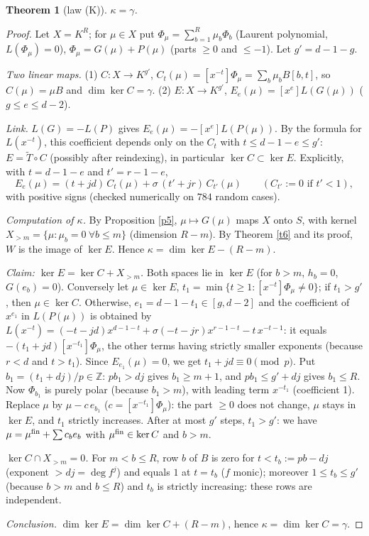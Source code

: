 \documentclass[11pt,a4paper]{article}
\newtheorem{thm}{Theorem}
\theoremstyle{remark}\newtheorem*{rem}{Remark}
\begin{document}
\begin{thm}[law (K)]\label{t9} $\kappa=\gamma$.\end{thm}
\begin{proof} Let $X=K^R$; for $\mu\in X$ put $\Phi_\mu=\sum_{b=1}^R\mu_b\Phi_b$ (Laurent polynomial, $L(\Phi_\mu)=0$), $\Phi_\mu=G(\mu)+P(\mu)$ (parts $\ge0$ and $\le-1$). Let $g'=d-1-g$.

\emph{Two linear maps.} (1) $C:X\to K^{g'}$, $C_t(\mu)=[x^{-t}]\Phi_\mu=\sum_b\mu_bB[b,t]$, so $C(\mu)=\mu B$ and $\dim\ker C=\gamma$. (2) $E:X\to K^{g'}$, $E_e(\mu)=[x^e]L(G(\mu))$ ($g\le e\le d-2$).

\emph{Link.} $L(G)=-L(P)$ gives $E_e(\mu)=-[x^e]L(P(\mu))$. By the formula for $L(x^{-t})$, this coefficient depends only on the $C_t$ with $t\le d-1-e\le g'$: $E=\widetilde T\circ C$ (possibly after reindexing), in particular $\ker C\subset\ker E$. Explicitly, with $t=d-1-e$ and $t'=r-1-e$,
$$E_e(\mu)=(t+jd)\,C_t(\mu)+\sigma\,(t'+jr)\,C_{t'}(\mu)\qquad(C_{t'}:=0\text{ if }t'<1),$$
with positive signs (checked numerically on $784$ random cases).

\emph{Computation of $\kappa$.} By Proposition \ref{p5}, $\mu\mapsto G(\mu)$ maps $X$ onto $S$, with kernel $X_{>m}=\{\mu:\mu_b=0\ \forall b\le m\}$ (dimension $R-m$). By Theorem \ref{t6} and its proof, $W$ is the image of $\ker E$. Hence $\kappa=\dim\ker E-(R-m)$.

\emph{Claim: $\ker E=\ker C+X_{>m}$.} Both spaces lie in $\ker E$ (for $b>m$, $h_b=0$, $G(e_b)=0$). Conversely let $\mu\in\ker E$, $t_1=\min\{t\ge1:[x^{-t}]\Phi_\mu\ne0\}$; if $t_1>g'$, then $\mu\in\ker C$. Otherwise, $e_1=d-1-t_1\in[g,d-2]$ and the coefficient of $x^{e_1}$ in $L(P(\mu))$ is obtained by $L(x^{-t})=(-t-jd)x^{d-1-t}+\sigma(-t-jr)x^{r-1-t}-t\,x^{-t-1}$: it equals $-(t_1+jd)[x^{-t_1}]\Phi_\mu$, the other terms having strictly smaller exponents (because $r<d$ and $t>t_1$). Since $E_{e_1}(\mu)=0$, we get $t_1+jd\equiv0\pmod p$. Put $b_1=(t_1+dj)/p\in\mathbb Z$: $pb_1>dj$ gives $b_1\ge m+1$, and $pb_1\le g'+dj$ gives $b_1\le R$. Now $\Phi_{b_1}$ is purely polar (because $b_1>m$), with leading term $x^{-t_1}$ (coefficient 1). Replace $\mu$ by $\mu-c\,e_{b_1}$ ($c=[x^{-t_1}]\Phi_\mu$): the part $\ge0$ does not change, $\mu$ stays in $\ker E$, and $t_1$ strictly increases. After at most $g'$ steps, $t_1>g'$: we have $\mu=\mu^{\rm fin}+\sum c_be_b$ with $\mu^{\rm fin}\in\ker C$ and $b>m$.

\emph{$\ker C\cap X_{>m}=0$.} For $m<b\le R$, row $b$ of $B$ is zero for $t<t_b:=pb-dj$ (exponent $>dj=\deg f^j$) and equals $1$ at $t=t_b$ ($f$ monic); moreover $1\le t_b\le g'$ (because $b>m$ and $b\le R$) and $t_b$ is strictly increasing: these rows are independent.

\emph{Conclusion.} $\dim\ker E=\dim\ker C+(R-m)$, hence $\kappa=\dim\ker C=\gamma$.\end{proof}
\end{document}
